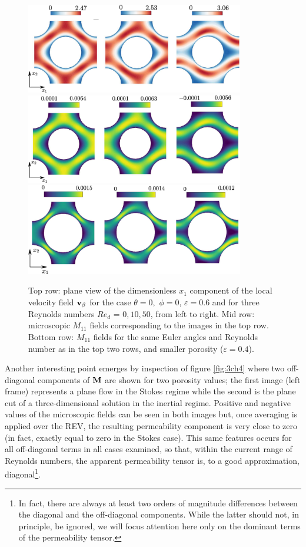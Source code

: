 \begin{figure}[H]
	\centering
	\includegraphics[width=0.85\textwidth]{chapter_4/figure/fig1}
	\includegraphics[width=0.85\textwidth]{chapter_4/figure/fig2}
	\includegraphics[width=0.85\textwidth]{chapter_4/figure/fig4}
	\caption{Top row: plane view of the dimensionless $x_1$ component of the local velocity field ${\textbf{v}_{\beta}}$ for the case $\theta=0,$ $\phi=0$, $\varepsilon=0.6$ and for three Reynolds numbers $Re_d$ = $0,10,50$, from left to right. Mid row: microscopic $M_{11}$ fields corresponding to the images in the top row. Bottom row: $M_{11}$ fields for the same Euler angles and Reynolds number as in the top two rows, and smaller porosity ($\varepsilon=0.4$).}
	\label{fig:1ch4}
\end{figure}


\newpage

Another interesting point emerges by inspection of  figure \ref{fig:3ch4} where two off-diagonal components of $\bf{M}$ are shown for two porosity 
values; the first image (left frame) represents a plane flow in the Stokes regime while the second is the plane cut of a three-dimensional 
solution in the inertial regime. Positive and negative values of the microscopic fields can be seen in both images but, once averaging is 
applied over the REV, the resulting permeability component is very close to zero (in fact, exactly equal to zero in the Stokes case).  This same features occurs for all off-diagonal terms in all cases examined, so that, within the current range of Reynolds numbers, the 
apparent permeability tensor is, to a good approximation, diagonal\footnote{In fact, there are always at least two orders of magnitude 
	differences between the diagonal and the off-diagonal components. While the latter should not, in principle, be ignored, we will focus attention 
	here only on the dominant terms of the permeability tensor.}.


